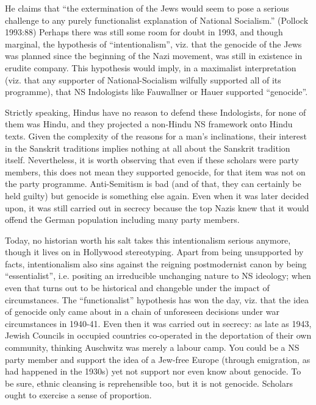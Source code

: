He claims that “the extermination of the Jews would seem to pose a serious challenge to any purely functionalist explanation of National Socialism.” (Pollock 1993:88) Perhaps there was still some room for doubt in 1993, and though marginal, the hypothesis of “intentionalism”, viz. that the genocide of the Jews was planned since the beginning of the Nazi movement, was still in existence in erudite company. This hypothesis would imply, in a maximalist interpretation (viz. that any supporter of National-Socialism wilfully supported all of its programme), that NS Indologists like Fauwallner or Hauer supported “genocide”.

Strictly speaking, Hindus have no reason to defend these Indologists, for none of them was Hindu, and they projected a non-Hindu NS framework onto Hindu texts. Given the complexity of the reasons for a man’s inclinations, their interest in the Sanskrit traditions implies nothing at all about the Sanskrit tradition itself. Nevertheless, it is worth observing that even if these scholars were party members, this does not mean they supported genocide, for that item was not on the party programme. Anti-Semitism is bad (and of that, they can certainly be held guilty) but genocide is something else again. Even when it was later decided upon, it was still carried out in secrecy because the top Nazis knew that it would offend the German population including many party members.

Today, no historian worth his salt takes this intentionalism serious anymore, though it lives on in Hollywood stereotyping. Apart from being unsupported by facts, intentionalism also sins against the reigning postmodernist canon by being “essentialist”, i.e. positing an irreducible unchanging nature to NS ideology; when even that turns out to be historical and changeble under the impact of circumstances. The “functionalist” hypothesis has won the day, viz. that the idea of genocide only came about in a chain of unforeseen decisions under war circumstances in 1940-41. Even then it was carried out in secrecy: as late as 1943, Jewish Councils in occupied countries co-operated in the deportation of their own community, thinking Auschwitz was merely a labour camp. You could be a NS party member and support the idea of a Jew-free Europe (through emigration, as had happened in the 1930s) yet not support nor even know about genocide. To be sure, ethnic cleansing is reprehensible too, but it is not genocide. Scholars ought to exercise a sense of proportion.

